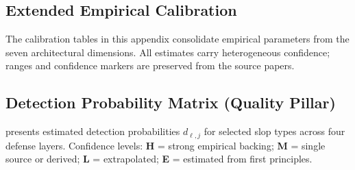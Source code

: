 \documentclass[11pt, a4paper, logo, copyright]{googledeepmind}
\begin{document}
\begin{appendices}


\section{Extended Empirical Calibration}
\label{app:calibration}

The calibration tables in this appendix consolidate empirical parameters
from the seven architectural dimensions. All estimates carry heterogeneous confidence;
ranges and confidence markers are preserved from the source papers.

\subsection{Detection Probability Matrix (Quality Pillar)}
\label{app:detection-matrix}

 presents estimated detection probabilities
$d_{\ell,j}$ for selected slop types across four defense layers.
Confidence levels: \textbf{H} = strong empirical backing;
\textbf{M} = single source or derived; \textbf{L} = extrapolated;
\textbf{E} = estimated from first principles.


\end{appendices}
\end{document}
